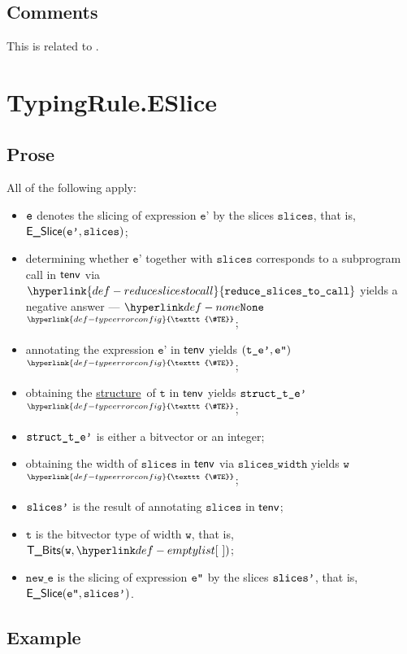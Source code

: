 \documentclass{book}
\newcommand\TypeErrorConfig[0]{\hyperlink{def-typeerrorconfig}{\texttt{\#TE}}}
\newcommand\ProseOrTypeError[0]{\hyperlink{def-proseortypeerror}{$^{\TypeErrorConfig}$}}
\newcommand\structure[0]{\hyperlink{def-structure}{structure}}
\newcommand\sliceswidth[0]{\texttt{slices\_width}}
\newcommand\reduceslicestocall[0]{\hyperlink{def-reduceslicestocall}{\texttt{reduce\_slices\_to\_call}}}
\newcommand\vt[0]{\texttt{t}}
\newcommand\vw[0]{\texttt{w}}
\newcommand\slices[0]{\texttt{slices}}
\newcommand\newe[0]{\texttt{new\_e}}
\newcommand\vep[0]{\texttt{e'}}
\begin{document}
\subsection{Comments}
  This is related to .

\section{TypingRule.ESlice \label{sec:TypingRule.ESlice}}

\subsection{Prose}
All of the following apply:
\begin{itemize}
  \item $\texttt{e}$ denotes the slicing of expression $\vep$ by the slices $\slices$, that is, \\
  $\ESlice(\vep, \slices)$;
  \item determining whether $\vep$ together with $\slices$ corresponds to a subprogram call
  in $\textsf{tenv}$ via $\reduceslicestocall$ yields a negative answer --- $\None$ \ProseOrTypeError;
  \item annotating the expression $\vep$ in $\textsf{tenv}$ yields $(\texttt{t\_e'},\texttt{e''})$ \ProseOrTypeError;
  \item obtaining the \structure\ of $\vt$ in $\textsf{tenv}$ yields $\texttt{struct\_t\_e'}$ \ProseOrTypeError;
  \item $\texttt{struct\_t\_e'}$ is either a bitvector or an integer;
  \item obtaining the width of $\slices$ in $\textsf{tenv}$ via $\sliceswidth$ yields $\vw$ \ProseOrTypeError;
  \item $\texttt{slices'}$ is the result of annotating $\slices$ in $\textsf{tenv}$;
  \item $\vt$ is the bitvector type of width $\vw$, that is, $\TBits(\vw, \emptylist)$;
  \item $\newe$ is the slicing of expression $\texttt{e''}$ by the slices $\texttt{slices'}$, that is, \\
  $\textsf{E\_Slice}(\texttt{e''}, \texttt{slices'})$.
\end{itemize}

\subsection{Example}

\end{document}

